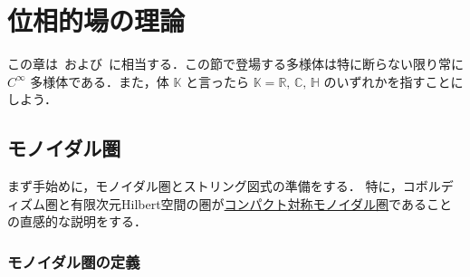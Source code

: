 \documentclass[TQFT_main]{subfiles}
\begin{document}
\setcounter{chapter}{2}

\chapter{位相的場の理論}

この章は~\cite[Chapter7]{Simon2021}および~\cite{Baez2011physics}に相当する．この節で登場する多様体は特に断らない限り常に $C^\infty$ 多様体である．また，体 $\mathbb{K}$ と言ったら $\mathbb{K} = \mathbb{R},\, \mathbb{C},\, \mathbb{H}$ のいずれかを指すことにしよう．

\section{モノイダル圏}

まず手始めに，モノイダル圏とストリング図式の準備をする．
特に，コボルディズム圏と有限次元Hilbert空間の圏が\hyperref[def:compact]{コンパクト}\hyperref[def:braided-monoidal]{対称モノイダル圏}であることの直感的な説明をする．

\subsection{モノイダル圏の定義}
\end{document}
